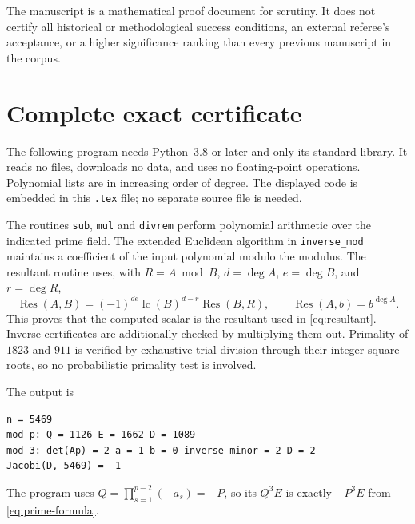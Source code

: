 \documentclass[11pt,a4paper]{article}
\theoremstyle{remark}
\DeclareMathOperator{\Res}{Res}
\begin{document}
The manuscript is a mathematical proof document for scrutiny. It does
not certify all historical or methodological success conditions, an
external referee's acceptance, or a higher significance ranking than
every previous manuscript in the corpus.
\appendix
\section{Complete exact certificate}\label{app:code}

The following program needs Python~3.8 or later and only its standard
library. It reads no files, downloads no data, and uses no floating-point
operations. Polynomial lists are in increasing order of degree.
The displayed code is embedded in this \texttt{.tex} file; no separate
source file is needed.

The routines \texttt{sub}, \texttt{mul} and \texttt{divrem} perform
polynomial arithmetic over the indicated prime field.
The extended Euclidean algorithm in \texttt{inverse\_mod} maintains
a coefficient of the input polynomial modulo the modulus.
The resultant routine uses, with \(R=A\bmod B\), \(d=\deg A\),
\(e=\deg B\), and \(r=\deg R\),
\[
\Res(A,B)=(-1)^{de}\operatorname{lc}(B)^{d-r}\Res(B,R),
\qquad \Res(A,b)=b^{\deg A}.
\]
This proves that the computed scalar is the resultant used in
\eqref{eq:resultant}. Inverse certificates are additionally checked
by multiplying them out. Primality of \(1823\) and \(911\) is
verified by exhaustive trial division through their integer square
roots, so no probabilistic primality test is involved.

The output is
\begin{verbatim}
n = 5469
mod p: Q = 1126 E = 1662 D = 1089
mod 3: det(Ap) = 2 a = 1 b = 0 inverse minor = 2 D = 2
Jacobi(D, 5469) = -1
\end{verbatim}
The program uses \(Q=\prod_{s=1}^{p-2}(-a_s)=-P\), so its
\(Q^3E\) is exactly \(-P^3E\) from \eqref{eq:prime-formula}.
\end{document}
